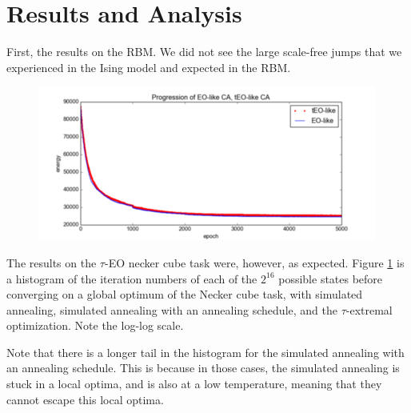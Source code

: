 \documentclass[12pt]{article}
\begin{document}
\section{Results and Analysis}
First, the results on the RBM. We did not see the large scale-free jumps that we experienced in the Ising model and expected in the RBM.


\begin{figure}
  \includegraphics{eo_rbm_unzoomed}
\end{figure}


The results on the $\tau$-EO necker cube task were, however, as expected. Figure \ref{fig:speed} is a histogram of the iteration numbers of each of the $2^16$ possible states before converging on a global optimum of the Necker cube task, with simulated annealing, simulated annealing with an annealing schedule, and the $\tau$-extremal optimization. Note the log-log scale.

\begin{figure}
  \label{fig:speed}
\end{figure}

Note that there is a longer tail in the histogram for the simulated annealing with an annealing schedule. This is because in those cases, the simulated annealing is stuck in a local optima, and is also at a low temperature, meaning that they cannot escape this local optima.




\end{document}
